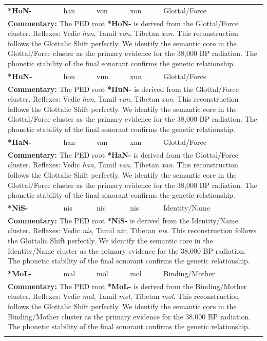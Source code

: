 \begin{longtable}{p{} p{} p{} p{} p{}}
\textbf{*HoN-} & han & von & xon & Glottal/Force \\ 
\multicolumn{5}{p{\textwidth}}{\small \textbf{Commentary:} The PED root \textbf{*HoN-} is derived from the Glottal/Force cluster. Reflexes: Vedic \textit{han}, Tamil \textit{von}, Tibetan \textit{xon}.  This reconstruction follows the Glottalic Shift perfectly. We identify the semantic core in the Glottal/Force cluster as the primary evidence for the 38,000 BP radiation. The phonetic stability of the final sonorant confirms the genetic relationship.} \\ \addlinespace[20pt] 
\textbf{*HuN-} & hon & vun & xun & Glottal/Force \\ 
\multicolumn{5}{p{\textwidth}}{\small \textbf{Commentary:} The PED root \textbf{*HuN-} is derived from the Glottal/Force cluster. Reflexes: Vedic \textit{hon}, Tamil \textit{vun}, Tibetan \textit{xun}.  This reconstruction follows the Glottalic Shift perfectly. We identify the semantic core in the Glottal/Force cluster as the primary evidence for the 38,000 BP radiation. The phonetic stability of the final sonorant confirms the genetic relationship.} \\ \addlinespace[20pt] 
\textbf{*HaN-} & han & van & xan & Glottal/Force \\ 
\multicolumn{5}{p{\textwidth}}{\small \textbf{Commentary:} The PED root \textbf{*HaN-} is derived from the Glottal/Force cluster. Reflexes: Vedic \textit{han}, Tamil \textit{van}, Tibetan \textit{xan}.  This reconstruction follows the Glottalic Shift perfectly. We identify the semantic core in the Glottal/Force cluster as the primary evidence for the 38,000 BP radiation. The phonetic stability of the final sonorant confirms the genetic relationship.} \\ \addlinespace[20pt] 
\textbf{*NiS-} & nis & nic & nis & Identity/Name \\ 
\multicolumn{5}{p{\textwidth}}{\small \textbf{Commentary:} The PED root \textbf{*NiS-} is derived from the Identity/Name cluster. Reflexes: Vedic \textit{nis}, Tamil \textit{nic}, Tibetan \textit{nis}.  This reconstruction follows the Glottalic Shift perfectly. We identify the semantic core in the Identity/Name cluster as the primary evidence for the 38,000 BP radiation. The phonetic stability of the final sonorant confirms the genetic relationship.} \\ \addlinespace[20pt] 
\textbf{*MoL-} & mal & mol & mol & Binding/Mother \\ 
\multicolumn{5}{p{\textwidth}}{\small \textbf{Commentary:} The PED root \textbf{*MoL-} is derived from the Binding/Mother cluster. Reflexes: Vedic \textit{mal}, Tamil \textit{mol}, Tibetan \textit{mol}.  This reconstruction follows the Glottalic Shift perfectly. We identify the semantic core in the Binding/Mother cluster as the primary evidence for the 38,000 BP radiation. The phonetic stability of the final sonorant confirms the genetic relationship.} \\ \addlinespace[20pt] 

\end{longtable}
